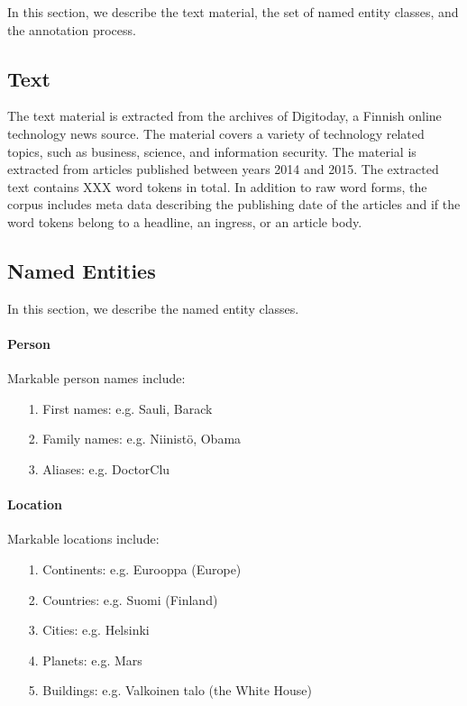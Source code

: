 \documentclass[11pt]{article}
\begin{document}
In this section, we describe the text material, the set of named entity classes, and the annotation process.

\subsection{Text}
\label{sec: text}

The text material is extracted from the archives of Digitoday, a Finnish online technology news source. The material covers a variety of technology related topics, such as business, science, and information security.  The material is extracted from articles published between years 2014 and 2015. The extracted text contains XXX word tokens in total. In addition to raw word forms, the corpus includes meta data describing the publishing date of the articles and if the word tokens belong to a headline, an ingress, or an article body. 


\subsection{Named Entities}
\label{sec: named entities}

In this section, we describe the named entity classes.



\paragraph{Person}

Markable person names include:

\begin{itemize}

\item[1.] First names: e.g. Sauli, Barack
\item[2.] Family names: e.g. Niinist\"o, Obama
\item[3.] Aliases: e.g. DoctorClu

\end{itemize}



\paragraph{Location}

Markable locations include:

\begin{itemize}

\item[1.] Continents: e.g. Eurooppa (Europe)
\item[2.] Countries: e.g. Suomi (Finland)
\item[3.] Cities: e.g. Helsinki
\item[4.] Planets: e.g. Mars
\item[5.] Buildings: e.g. Valkoinen talo (the White House)

\end{itemize}
\end{document}
